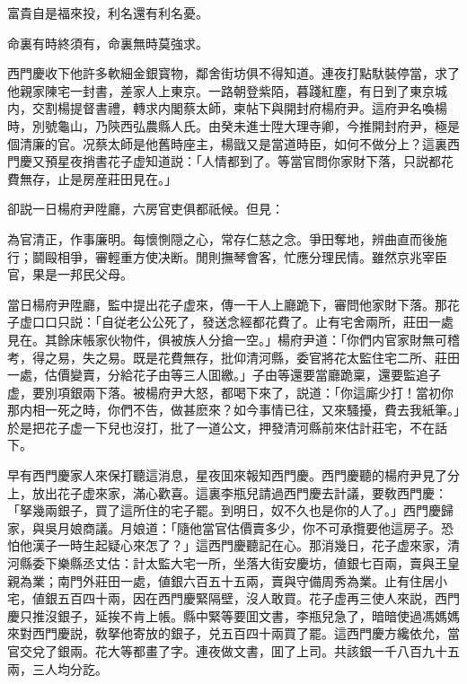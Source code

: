 \begin{myquote}
富貴自是福來投，利名還有利名憂。

命裏有時終須有，命裏無時莫強求。
\end{myquote}

西門慶收下他許多軟細金銀寳物，鄰舍街坊俱不得知道。連夜打點馱裝停當，求了他親家陳宅一封書，差家人上東京。一路朝登紫陌，暮踐紅塵，有日到了東京城内，交割楊提督書禮，轉求内閣蔡太師，柬帖下與開封府楊府尹。這府尹名喚楊時，別號龜山，乃陝西弘農縣人氏。由癸未進士陞大理寺卿，今推開封府尹，極是個清廉的官。况蔡太師是他舊時座主，楊戩又是當道時臣，如何不做分上？這裏西門慶又預星夜捎書花子虚知道説：「人情都到了。等當官問你家財下落，只説都花費無存，止是房産莊田見在。」

卻説一日楊府尹陞廳，六房官吏俱都祇候。但見：

\begin{myquote}
為官清正，作事廉明。每懷惻隠之心，常存仁慈之念。爭田奪地，辨曲直而後施行；鬬毆相爭，審輕重方使决断。閒則撫琴會客，忙應分理民情。雖然京兆宰臣官，果是一邦民父母。
\end{myquote}

當日楊府尹陞廳，監中提出花子虚來，傳一干人上廳跪下，審問他家財下落。那花子虚口口只説：「自従老公公死了，發送念經都花費了。止有宅舍兩所，莊田一處見在。其餘床帳家伙物件，俱被族人分搶一空。」楊府尹道：「你們内官家財無可稽考，得之易，失之易。既是花費無存，批仰清河縣，委官將花太監住宅二所、莊田一處，估價變賣，分給花子由等三人囬繳。」子由等還要當廳跪稟，還要監追子虚，要別項銀兩下落。被楊府尹大怒，都喝下來了，説道：「你這廝少打！當初你那内相一死之時，你們不告，做甚麽來？如今事情已往，又來騷擾，費去我紙筆。」於是把花子虚一下兒也沒打，批了一道公文，押發清河縣前來估計莊宅，不在話下。

早有西門慶家人來保打聽這消息，星夜囬來報知西門慶。西門慶聽的楊府尹見了分上，放出花子虚來家，滿心歡喜。這裏李瓶兒請過西門慶去計議，要敎西門慶：「拏幾兩銀子，買了這所住的宅子罷。到明日，奴不久也是你的人了。」西門慶歸家，與吳月娘商議。月娘道：「隨他當官估價賣多少，你不可承攬要他這房子。恐怕他漢子一時生起疑心來怎了？」這西門慶聽記在心。那消幾日，花子虚來家，清河縣委下樂縣丞丈估：計太監大宅一所，坐落大街安慶坊，値銀七百兩，賣與王皇親為業；南門外莊田一處，値銀六百五十五兩，賣與守備周秀為業。止有住居小宅，値銀五百四十兩，因在西門慶緊隔壁，沒人敢買。花子虚再三使人來説，西門慶只推沒銀子，延挨不肯上帳。縣中緊等要囬文書，李瓶兒急了，暗暗使過馮媽媽來對西門慶説，敎拏他寄放的銀子，兑五百四十兩買了罷。這西門慶方纔依允，當官交兌了銀兩。花大等都畫了字。連夜做文書，囬了上司。共該銀一千八百九十五兩，三人均分訖。

